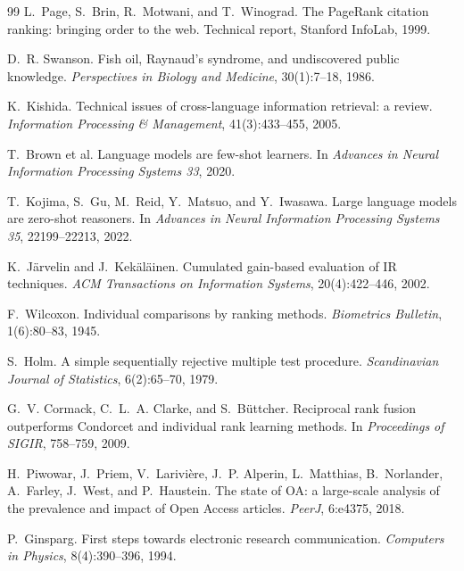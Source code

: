 \documentclass[sigconf,screen]{acmart}
\begin{document}
\begin{thebibliography}{99}
L.~Page, S.~Brin, R.~Motwani, and T.~Winograd.
\newblock The PageRank citation ranking: bringing order to the web.
\newblock Technical report, Stanford InfoLab, 1999.

D.~R. Swanson.
\newblock Fish oil, Raynaud's syndrome, and undiscovered public knowledge.
\newblock \emph{Perspectives in Biology and Medicine}, 30(1):7--18, 1986.

K.~Kishida.
\newblock Technical issues of cross-language information retrieval: a review.
\newblock \emph{Information Processing \& Management}, 41(3):433--455, 2005.

T.~Brown et al.
\newblock Language models are few-shot learners.
\newblock In \emph{Advances in Neural Information Processing Systems 33},
2020.

T.~Kojima, S.~Gu, M.~Reid, Y.~Matsuo, and Y.~Iwasawa.
\newblock Large language models are zero-shot reasoners.
\newblock In \emph{Advances in Neural Information Processing Systems 35},
22199--22213, 2022.

K.~J\"arvelin and J.~Kek\"al\"ainen.
\newblock Cumulated gain-based evaluation of IR techniques.
\newblock \emph{ACM Transactions on Information Systems}, 20(4):422--446,
2002.

F.~Wilcoxon.
\newblock Individual comparisons by ranking methods.
\newblock \emph{Biometrics Bulletin}, 1(6):80--83, 1945.

S.~Holm.
\newblock A simple sequentially rejective multiple test procedure.
\newblock \emph{Scandinavian Journal of Statistics}, 6(2):65--70, 1979.

G.~V. Cormack, C.~L.~A. Clarke, and S.~B\"uttcher.
\newblock Reciprocal rank fusion outperforms Condorcet and individual
rank learning methods.
\newblock In \emph{Proceedings of SIGIR}, 758--759, 2009.

H.~Piwowar, J.~Priem, V.~Larivi\`ere, J.~P. Alperin, L.~Matthias,
B.~Norlander, A.~Farley, J.~West, and P.~Haustein.
\newblock The state of OA: a large-scale analysis of the prevalence and
impact of Open Access articles.
\newblock \emph{PeerJ}, 6:e4375, 2018.

P.~Ginsparg.
\newblock First steps towards electronic research communication.
\newblock \emph{Computers in Physics}, 8(4):390--396, 1994.


\end{thebibliography}
\end{document}
